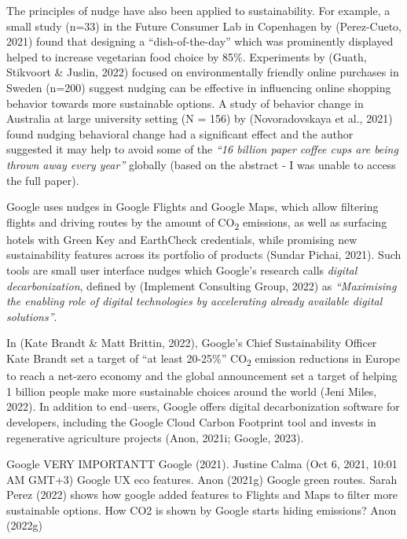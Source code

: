 \documentclass[
  letterpaper,
  DIV=11,
  numbers=noendperiod]{scrartcl}
\begin{document}
The principles of nudge have also been applied to sustainability. For
example, a small study (n=33) in the Future Consumer Lab in Copenhagen
by (Perez-Cueto, 2021) found that designing a ``dish-of-the-day'' which
was prominently displayed helped to increase vegetarian food choice by
85\%. Experiments by (Guath, Stikvoort \& Juslin, 2022) focused on
environmentally friendly online purchases in Sweden (n=200) suggest
nudging can be effective in influencing online shopping behavior towards
more sustainable options. A study of behavior change in Australia at
large university setting (N = 156) by (Novoradovskaya et al., 2021)
found nudging behavioral change had a significant effect and the author
suggested it may help to avoid some of the \emph{``16 billion paper
coffee cups are being thrown away every year''} globally (based on the
abstract - I was unable to access the full paper).

Google uses nudges in Google Flights and Google Maps, which allow
filtering flights and driving routes by the amount of
CO\textsubscript{2} emissions, as well as surfacing hotels with Green
Key and EarthCheck credentials, while promising new sustainability
features across its portfolio of products (Sundar Pichai, 2021). Such
tools are small user interface nudges which Google's research calls
\emph{digital decarbonization}, defined by (Implement Consulting Group,
2022) as \emph{``Maximising the enabling role of digital technologies by
accelerating already available digital solutions''}.

In (Kate Brandt \& Matt Brittin, 2022), Google's Chief Sustainability
Officer Kate Brandt set a target of ``at least 20-25\%''
CO\textsubscript{2} emission reductions in Europe to reach a net-zero
economy and the global announcement set a target of helping 1 billion
people make more sustainable choices around the world (Jeni Miles,
2022). In addition to end--users, Google offers digital decarbonization
software for developers, including the Google Cloud Carbon Footprint
tool and invests in regenerative agriculture projects (Anon, 2021i;
Google, 2023).

Google VERY IMPORTANTT Google (2021). Justine Calma (Oct 6, 2021, 10:01
AM GMT+3) Google UX eco features. Anon (2021g) Google green routes.
Sarah Perez (2022) shows how google added features to Flights and Maps
to filter more sustainable options. How CO2 is shown by Google starts
hiding emissions? Anon (2022g)
\end{document}
